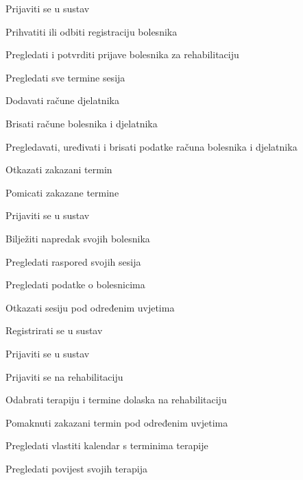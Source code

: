 \documentclass[12pt]{report}
\newenvironment{packed_enum}{
	\begin{enumerate}
		\setlength{\itemsep}{0pt}
		\setlength{\parskip}{0pt}
		\setlength{\parsep}{0pt}
	}{\end{enumerate}}
\begin{document}
\begin{packed_enum}
	\item  {}

	\begin{packed_enum}

        \item Prijaviti se u sustav 
	\item Prihvatiti ili odbiti registraciju bolesnika
        \item Pregledati i potvrditi prijave bolesnika za rehabilitaciju
        \item Pregledati sve termine sesija
        \item Dodavati račune djelatnika
        \item Brisati račune bolesnika i djelatnika
        \item Pregledavati, uređivati i brisati podatke računa bolesnika i djelatnika
        \item Otkazati zakazani termin 
        \item Pomicati zakazane termine 

	\end{packed_enum}

	\item  {}

	\begin{packed_enum}

        	\item Prijaviti se u sustav 
		\item Bilježiti napredak svojih bolesnika
		\item Pregledati raspored svojih sesija
		\item Pregledati podatke o bolesnicima
		\item Otkazati sesiju pod određenim uvjetima

	\end{packed_enum}

	\item {}

	\begin{packed_enum}

		\item Registrirati se u sustav
        	\item Prijaviti se u sustav 
		\item Prijaviti se na rehabilitaciju
		\item Odabrati terapiju i termine dolaska na rehabilitaciju
		\item Pomaknuti zakazani termin pod određenim uvjetima
		\item Pregledati vlastiti kalendar s terminima terapije
		\item Pregledati povijest svojih terapija 
  


\end{packed_enum}
\end{packed_enum}
\end{document}

